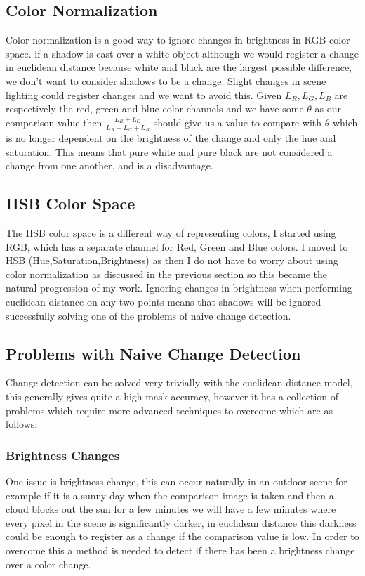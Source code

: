 \documentclass[a4paper]{report}
\begin{document}
\subsection{Color Normalization}
Color normalization is a good way to ignore changes in brightness in RGB color space. if a shadow is cast over a white object although we would register a change in euclidean distance because white and black are the largest possible difference, we don't want to consider shadows to be a change. Slight changes in scene lighting could register changes and we want to avoid this. Given $L_R,L_G,L_B$ are respectively the red, green and blue color channels and we have some $\theta$ as our comparison value then $\frac{L_R + L_G}{L_R + L_G + L_B}$ should give us a value to compare with $\theta$ which is no longer dependent on the brightness of the change and only the hue and saturation. This means that pure white and pure black are not considered a change from one another, and is a disadvantage.

\subsection{HSB Color Space}
The HSB color space is a different way of representing colors, I started using RGB, which has a separate channel for Red, Green and Blue colors. I moved to HSB (Hue,Saturation,Brightness) as then I do not have to worry about using color normalization as discussed in the previous section so this became the natural progression of my work. Ignoring changes in brightness when performing euclidean distance on any two points means that shadows will be ignored successfully solving one of the problems of naive change detection.

\subsection{Problems with Naive Change Detection}
Change detection can be solved very trivially with the euclidean distance model, this generally gives quite a high mask accuracy, however it has a collection of problems which require more advanced techniques to overcome which are as follows:

\subsubsection{Brightness Changes}
One issue is brightness change, this can occur naturally in an outdoor scene for example if it is a sunny day when the comparison image is taken and then a cloud blocks out the sun for a few minutes we will have a few minutes where every pixel in the scene is significantly darker, in euclidean distance this darkness could be enough to register as a change if the comparison value is low. In order to overcome this a method is needed to detect if there has been a brightness change over a color change.
\end{document}
